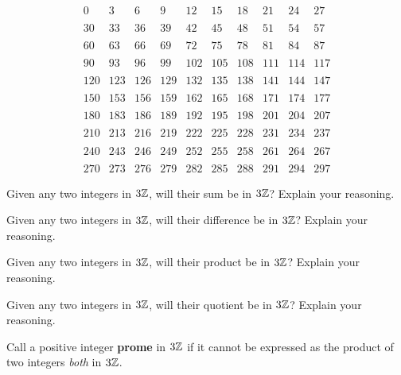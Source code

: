 \[
\begin{array}{cccccccccc}
0   & 3   & 6   & 9   & 12  & 15  & 18  & 21  & 24  & 27  \\
\\
30  & 33  & 36  & 39  & 42  & 45  & 48  & 51  & 54  & 57  \\
\\
60  & 63  & 66  & 69  & 72  & 75  & 78  & 81  & 84  & 87  \\
\\
90  & 93  & 96  & 99  & 102 & 105 & 108 & 111 & 114 & 117 \\
\\
120 & 123 & 126 & 129 & 132 & 135 & 138 & 141 & 144 & 147 \\
\\
150 & 153 & 156 & 159 & 162 & 165 & 168 & 171 & 174 & 177 \\
\\
180 & 183 & 186 & 189 & 192 & 195 & 198 & 201 & 204 & 207 \\
\\
210 & 213 & 216 & 219 & 222 & 225 & 228 & 231 & 234 & 237 \\
\\
240 & 243 & 246 & 249 & 252 & 255 & 258 & 261 & 264 & 267 \\
\\
270 & 273 & 276 & 279 & 282 & 285 & 288 & 291 & 294 & 297
\end{array}
\]



\begin{prob}
Given any two integers in $3\mathbb Z$, will their sum be in $3\mathbb Z$? Explain
your reasoning.
\end{prob}

\begin{prob}
Given any two integers in $3\mathbb Z$, will their difference be in $3\mathbb Z$?
Explain your reasoning.
\end{prob}

\begin{prob}
Given any two integers in $3\mathbb Z$, will their product be in $3\mathbb Z$?
Explain your reasoning.
\end{prob}

\begin{prob}
Given any two integers in $3\mathbb Z$, will their quotient be in $3\mathbb Z$?
Explain your reasoning.
\end{prob}

\begin{definition}
Call a positive integer \textbf{prome} in $3\mathbb Z$ if it cannot be
expressed as the product of two integers \textit{both} in $3\mathbb Z$.
\end{definition}


